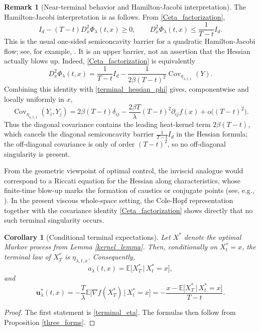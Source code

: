 \documentclass[11pt]{amsart}
\newcommand{\E}{\mathbb{E}}
\renewcommand{\geq}{\geqslant}
\renewcommand{\leq}{\leqslant}
\numberwithin{equation}{section}
\numberwithin{figure}{section}
\newtheorem{corollary}[theorem]{Corollary}%
\theoremstyle{definition}\newtheorem{remark}[theorem]{Remark}%
\begin{document}
\begin{remark}[Near-terminal behavior and Hamilton-Jacobi interpretation]
The Hamilton-Jacobi interpretation is as follows. From \eqref{Ceta_factorization},
$$
I_d-(T-t)D_x^2\Phi_\lambda(t,x)\geq 0,
\qquad
D_x^2\Phi_\lambda(t,x)\leq \frac{1}{T-t}I_d.
$$
This is the usual one-sided semiconcavity barrier for a quadratic Hamilton-Jacobi flow; see, for example, \cite{BardiCapuzzoDolcetta97, CannarsaSinestrari04, lions1982generalized}. It is an upper barrier, not an assertion that the Hessian actually blows up. Indeed, \eqref{Ceta_factorization} is equivalently
$$
D_x^2\Phi_\lambda(t,x) = \frac{1}{T-t}I_d - \frac{1}{2\beta(T-t)^2}\operatorname{Cov}_{\eta_{\lambda,t,x}}(Y).
$$
Combining this identity with \eqref{terminal_hessian_phi} gives, componentwise and locally uniformly in $x$,
$$
\operatorname{Cov}_{\eta_{\lambda,t,x}}(Y_i,Y_j)
= 2\beta(T-t)\delta_{ij} - \frac{2\beta T}{\lambda}(T-t)^2\partial_{ij}f(x) + \mathrm{o}\big((T-t)^2\big).
$$
Thus the diagonal covariance contains the leading heat-kernel term $2\beta(T-t)$, which cancels the diagonal semiconcavity barrier $\frac{1}{T-t}I_d$ in the Hessian formula; the off-diagonal covariance is only of order $(T-t)^2$, so no off-diagonal singularity is present.

From the geometric viewpoint of optimal control, the inviscid analogue would correspond to a Riccati equation for the Hessian along characteristics, whose finite-time blow-up marks the formation of caustics or conjugate points (see, e.g., \cite{AgrachevSachkov04,BonnardCaillauTrelat07}). In the present viscous whole-space setting, the Cole-Hopf representation together with the covariance identity \eqref{Ceta_factorization} shows directly that no such terminal singularity occurs.
\end{remark}



\begin{corollary}[Conditional terminal expectations]\label{conditional_cor}
Let $X^*$ denote the optimal Markov process from Lemma \ref{kernel_lemma}. Then, conditionally on $X_t^* = x$, the terminal law of $X_T^*$ is $\eta_{\lambda,t,x}$. Consequently,
$$
a_\lambda(t,x) = \E \big[ X_T^* \,\vert\, X_t^* = x \big],
$$
and
$$
\mathbf u_\lambda^*(t,x) = - \frac{T}{\lambda}\E \big[ \nabla f(X_T^*) \,\vert\, X_t^* = x \big] = - \frac{x - \E \big[ X_T^* \,\vert\, X_t^* = x \big]}{T-t}.
$$
\end{corollary}

\begin{proof}
The first statement is \eqref{terminal_eta}. The formulas then follow from Proposition \ref{three_forms}.
\end{proof}
\end{document}

